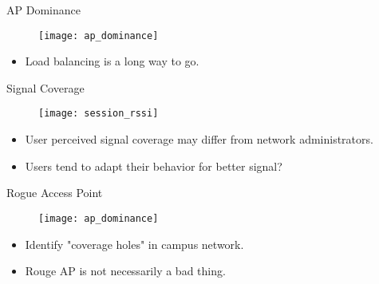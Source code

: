 \begin{frame}{AP Dominance}
  \begin{figure}
    \centering
    \texttt{[image: ap\_dominance]}
  \end{figure}
  \begin{itemize}
    \item Load balancing is a long way to go.
  \end{itemize}
\end{frame}

\begin{frame}{Signal Coverage}
  \begin{figure}
    \centering
    \texttt{[image: session\_rssi]}
  \end{figure}
  \begin{itemize}
    \item User perceived signal coverage may differ from network administrators.
    \item Users tend to adapt their behavior for better signal?
  \end{itemize}
\end{frame}

\begin{frame}{Rogue Access Point}
  \begin{figure}
    \centering
    \texttt{[image: ap\_dominance]}
  \end{figure}
  \begin{itemize}
    \item Identify "coverage holes" in campus network.
    \item Rouge AP is not necessarily a bad thing.
  \end{itemize}
\end{frame}
